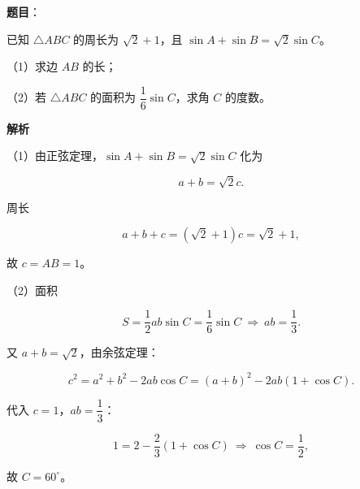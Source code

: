\begin{answer}

\textbf{题目}：

已知 $\triangle ABC$ 的周长为 $\sqrt2+1$，且 $\sin A+\sin B=\sqrt2\sin C$。

（1）求边 $AB$ 的长；

（2）若 $\triangle ABC$ 的面积为 $\dfrac16\sin C$，求角 $C$ 的度数。

\textbf{解析}

（1）由正弦定理，$\sin A+\sin B=\sqrt2\sin C$ 化为

\nopagebreak[4]
\[a+b=\sqrt2c.\]

周长

\nopagebreak[4]
\[a+b+c=(\sqrt2+1)c=\sqrt2+1,\]

故 $c=AB=1$。

（2）面积

\nopagebreak[4]
\[S=\frac12ab\sin C=\frac16\sin C\ \Rightarrow\ ab=\frac13.\]

又 $a+b=\sqrt2$，由余弦定理：

\nopagebreak[4]
\[c^2=a^2+b^2-2ab\cos C=(a+b)^2-2ab(1+\cos C).\]

代入 $c=1$，$ab=\dfrac13$：

\nopagebreak[4]
\[1=2-\frac23(1+\cos C)\ \Rightarrow\ \cos C=\frac12,\]

故 $C=60^\circ$。


\end{answer}
